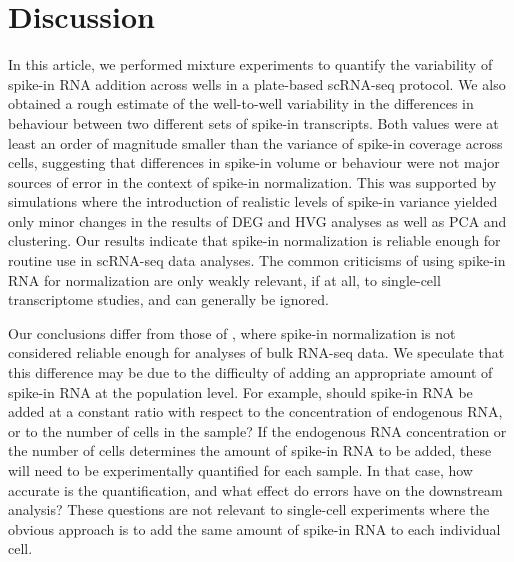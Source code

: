\documentclass{article}
\begin{document}
\section*{Discussion}
In this article, we performed mixture experiments to quantify the variability of spike-in RNA addition across wells in a plate-based scRNA-seq protocol.
We also obtained a rough estimate of the well-to-well variability in the differences in behaviour between two different sets of spike-in transcripts.
Both values were at least an order of magnitude smaller than the variance of spike-in coverage across cells, suggesting that differences in spike-in volume or behaviour were not major sources of error in the context of spike-in normalization.
This was supported by simulations where the introduction of realistic levels of spike-in variance yielded only minor changes in the results of DEG and HVG analyses as well as PCA and clustering.
Our results indicate that spike-in normalization is reliable enough for routine use in scRNA-seq data analyses.
The common criticisms of using spike-in RNA for normalization are only weakly relevant, if at all, to single-cell transcriptome studies, and can generally be ignored.

Our conclusions differ from those of \citet{risso2014normalization}, where spike-in normalization is not considered reliable enough for analyses of bulk RNA-seq data.
We speculate that this difference may be due to the difficulty of adding an appropriate amount of spike-in RNA at the population level.
For example, should spike-in RNA be added at a constant ratio with respect to the concentration of endogenous RNA, or to the number of cells in the sample?
If the endogenous RNA concentration or the number of cells determines the amount of spike-in RNA to be added, these will need to be experimentally quantified for each sample.
In that case, how accurate is the quantification, and what effect do errors have on the downstream analysis?
These questions are not relevant to single-cell experiments where the obvious approach is to add the same amount of spike-in RNA to each individual cell.
\end{document}
